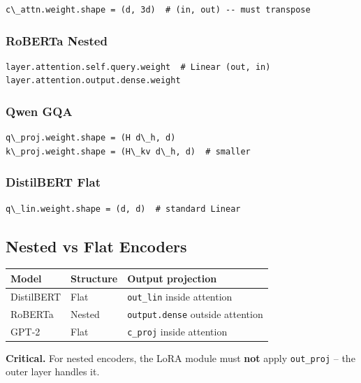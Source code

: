 \begin{lstlisting}
c\_attn.weight.shape = (d, 3d)  # (in, out) -- must transpose
\end{lstlisting}

\subsubsection{RoBERTa Nested}

\begin{lstlisting}
layer.attention.self.query.weight  # Linear (out, in)
layer.attention.output.dense.weight
\end{lstlisting}

\subsubsection{Qwen GQA}

\begin{lstlisting}
q\_proj.weight.shape = (H d\_h, d)
k\_proj.weight.shape = (H\_kv d\_h, d)  # smaller
\end{lstlisting}

\subsubsection{DistilBERT Flat}

\begin{lstlisting}
q\_lin.weight.shape = (d, d)  # standard Linear
\end{lstlisting}

\subsection{Nested vs Flat Encoders}

\begin{table}[H]
\centering
\small
\begin{tabular}{lll}
\toprule
\textbf{Model} & \textbf{Structure} & \textbf{Output projection} \\
\midrule
DistilBERT & Flat & \texttt{out\_lin} inside attention \\
RoBERTa & Nested & \texttt{output.dense} outside attention \\
GPT-2 & Flat & \texttt{c\_proj} inside attention \\
\bottomrule
\end{tabular}
\end{table}

\textbf{Critical.} For nested encoders, the LoRA module must \textbf{not} apply 
\texttt{out\_proj} -- the outer layer handles it.

